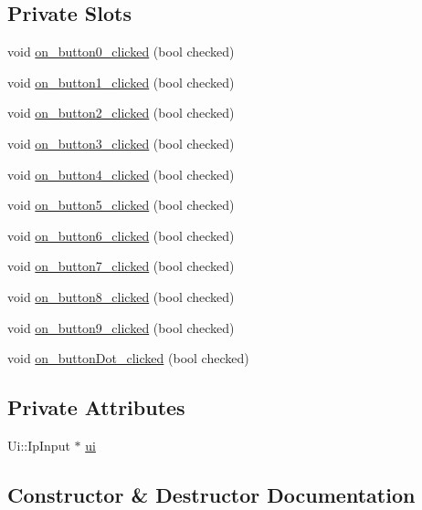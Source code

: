 \subsection*{Private Slots}
\begin{DoxyCompactItemize}
\item 
void \hyperlink{classIpInput_a1fc1ff2a2b0e350bbcc6e3e72ec7f044}{on\+\_\+button0\+\_\+clicked} (bool checked)
\item 
void \hyperlink{classIpInput_a451d6827bc280d34146d9cd843f660c8}{on\+\_\+button1\+\_\+clicked} (bool checked)
\item 
void \hyperlink{classIpInput_ac07b5e8c83bcba986956178758517963}{on\+\_\+button2\+\_\+clicked} (bool checked)
\item 
void \hyperlink{classIpInput_a88b3d07330a41ce3d2e6e66cbc1591c5}{on\+\_\+button3\+\_\+clicked} (bool checked)
\item 
void \hyperlink{classIpInput_abc78ea1e2349a87dca700beb11edc74f}{on\+\_\+button4\+\_\+clicked} (bool checked)
\item 
void \hyperlink{classIpInput_a1506bb196e4ed1bf7432e37c3a7fa180}{on\+\_\+button5\+\_\+clicked} (bool checked)
\item 
void \hyperlink{classIpInput_ade74543fea80105b34daffb61c956fc2}{on\+\_\+button6\+\_\+clicked} (bool checked)
\item 
void \hyperlink{classIpInput_a77cdc98b7572afa030e58f637e05e7de}{on\+\_\+button7\+\_\+clicked} (bool checked)
\item 
void \hyperlink{classIpInput_a994482d6c14304778f38276dbe6ce8a8}{on\+\_\+button8\+\_\+clicked} (bool checked)
\item 
void \hyperlink{classIpInput_ab3bb6c47e2a7b30e05462be39623fbd9}{on\+\_\+button9\+\_\+clicked} (bool checked)
\item 
void \hyperlink{classIpInput_add23563d5448f2c8240b06347676c649}{on\+\_\+button\+Dot\+\_\+clicked} (bool checked)
\end{DoxyCompactItemize}
\subsection*{Private Attributes}
\begin{DoxyCompactItemize}
\item 
Ui\+::\+Ip\+Input $\ast$ \hyperlink{classIpInput_a867b68834adba8912e05242487a6eb13}{ui}
\end{DoxyCompactItemize}


\subsection{Constructor \& Destructor Documentation}
